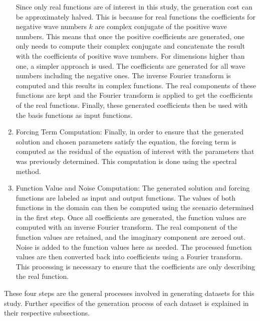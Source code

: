 \begin{enumerate}
    Since only real functions are of interest in this study, the generation cost can be approximately halved. This is because for real functions the coefficients for negative wave numbers \(k\) are complex conjugate of the positive wave numbers. This means that once the positive coefficients are generated, one only needs to compute their complex conjugate and concatenate the result with the coefficients of positive wave numbers. For dimensions higher than one, a simpler approach is used. The coefficients are generated for all wave numbers including the negative ones. The inverse Fourier transform is computed and this results in complex functions. The real components of these functions are kept and the Fourier transform is applied to get the coefficients of the real functions. Finally, these generated coefficients then be used with the basis functions as input functions.
  \item Forcing Term Computation:
    Finally, in order to ensure that the generated solution and chosen parameters satisfy the equation, the forcing term is computed as the residual of the equation of interest with the parameters that was previously determined. This computation is done using the spectral method.
  \item Function Value and Noise Computation:
    The generated solution and forcing functions are labeled as input and output functions. The values of both functions in the domain can then be computed using the scenario determined in the first step. Once all coefficients are generated, the function values are computed with an inverse Fourier transform. The real component of the function values are retained, and the imaginary component are zeroed out. Noise is added to the function values here as needed. The processed function values are then converted back into coefficients using a Fourier transform. This processing is necessary to ensure that the coefficients are only describing the real function.

\end{enumerate}

These four steps are the general processes involved in generating datasets for this study. Further specifics of the generation process of each dataset is explained in their respective subsections.

